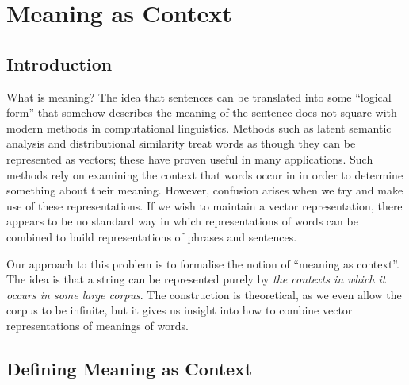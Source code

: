 
 \newcommand{\Cont}{\mathrm{Cont}}
%

%

\chapter{Meaning as Context}


\section{Introduction}

What is meaning? The idea that sentences can be translated into some ``logical form'' that somehow describes the meaning of the sentence does not square with modern methods in computational linguistics. Methods such as latent semantic analysis and distributional similarity treat words as though they can be represented as vectors; these have proven useful in many applications. Such methods rely on examining the context that words occur in in order to determine something about their meaning. However, confusion arises when we try and make use of these representations. If we wish to maintain a vector representation, there appears to be no standard way in which representations of words can be combined to build representations of phrases and sentences.

Our approach to this problem is to formalise the notion of ``meaning as context''. The idea is that a string can be represented purely by \emph{the contexts in which it occurs in some large corpus}. The construction is theoretical, as we even allow the corpus to be infinite, but it gives us insight into how to combine vector representations of meanings of words.

\section{Defining Meaning as Context}
 
